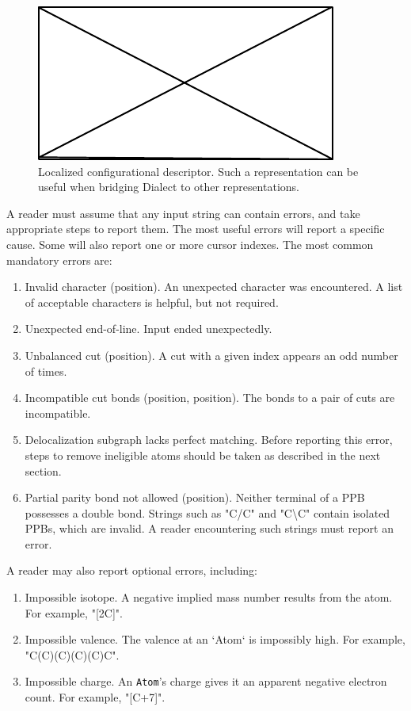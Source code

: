 \documentclass{article}
\def\ttt{\texttt}
\begin{document}
\begin{figure}
    \centering
    \includegraphics{filler}
    \caption{Localized configurational descriptor. Such a representation can be useful when bridging Dialect to other representations.}
    \label{fig:localized-configurational-descriptor}
\end{figure}

A reader must assume that any input string can contain errors, and take appropriate steps to report them. The most useful errors will report a specific cause. Some will also report one or more cursor indexes. The most common mandatory errors are:

\begin{enumerate}
    \item{Invalid character (position). An unexpected character was encountered. A list of acceptable characters is helpful, but not required.}
    \item{Unexpected end-of-line. Input ended unexpectedly.}
    \item{Unbalanced cut (position). A cut with a given index appears an odd number of times.}
    \item{Incompatible cut bonds (position, position). The bonds to a pair of cuts are incompatible.}
    \item{Delocalization subgraph lacks perfect matching. Before reporting this error, steps to remove ineligible atoms should be taken as described in the next section.}
    \item{Partial parity bond not allowed (position). Neither terminal of a PPB possesses a double bond. Strings such as "C/C" and "C{\textbackslash}C" contain isolated PPBs, which are invalid. A reader encountering such strings must report an error.}
\end{enumerate}

A reader may also report optional errors, including:

\begin{enumerate}
    \item{Impossible isotope. A negative implied mass number results from the atom. For example, "[2C]".}
    \item{Impossible valence. The valence at an `Atom` is impossibly high. For example, "C(C)(C)(C)(C)C".}
    \item{Impossible charge. An \ttt{Atom}'s charge gives it an apparent negative electron count. For example, "[C+7]".}
\end{enumerate}
\end{document}
